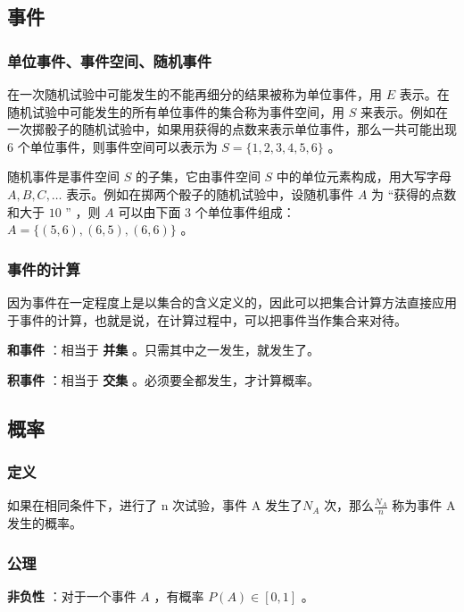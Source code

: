 
\subsection{事件}

\subsubsection{单位事件、事件空间、随机事件}

在一次随机试验中可能发生的不能再细分的结果被称为单位事件，用 $E$ 表示。在随机试验中可能发生的所有单位事件的集合称为事件空间，用 $S$ 来表示。例如在一次掷骰子的随机试验中，如果用获得的点数来表示单位事件，那么一共可能出现 $6$ 个单位事件，则事件空间可以表示为 $S=\{1,2,3,4,5,6\}$ 。

随机事件是事件空间 $S$ 的子集，它由事件空间 $S$ 中的单位元素构成，用大写字母 $A, B, C,\ldots$ 表示。例如在掷两个骰子的随机试验中，设随机事件 $A$ 为 “获得的点数和大于 $10$ ” ，则 $A$ 可以由下面 $3$ 个单位事件组成： $A = \{ (5,6),(6,5),(6,6)\}$ 。

\subsubsection{事件的计算}

因为事件在一定程度上是以集合的含义定义的，因此可以把集合计算方法直接应用于事件的计算，也就是说，在计算过程中，可以把事件当作集合来对待。

\textbf{ 和事件 } ：相当于 \textbf{ 并集 } 。只需其中之一发生，就发生了。

\textbf{ 积事件 } ：相当于 \textbf{ 交集 } 。必须要全都发生，才计算概率。

\subsection{概率}

\subsubsection{定义}

如果在相同条件下，进行了 n 次试验，事件 A 发生了$N_A$ 次，那么$\frac{N_A}{n}$ 称为事件 A 发生的概率。

\subsubsection{公理}

\textbf{ 非负性 } ：对于一个事件 $A$ ，有概率 $P(A)\in [0,1]$ 。

